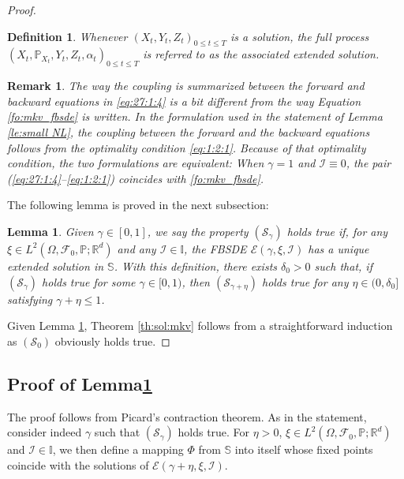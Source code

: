 \documentclass[11pt]{amsart}
\newtheorem{lemma}[theorem]{Lemma}
\newtheorem{definition}[theorem]{Definition}
\newtheorem{remark}[theorem]{Remark}
\begin{document}
\begin{proof}
\begin{definition}
Whenever $(X_{t},Y_{t},Z_{t})_{0 \leq t \leq T}$ is a solution, the full process $(X_{t},{\mathbb P}_{X_{t}},Y_{t},Z_{t},\alpha_{t})_{0 \leq t \leq T}$ is referred to as the  \emph{associated extended solution}.
\end{definition}

\begin{remark}
\label{rem:notation}
The way the coupling is summarized between the forward and backward equations in \eqref{eq:27:1:4} is a bit different from the way Equation \eqref{fo:mkv_fbsde} is written. In the formulation used in the statement of Lemma \ref{le:small NL}, the coupling between the forward and the backward equations follows from the optimality condition \eqref{eq:1:2:1}. Because of that optimality condition, 
the two formulations are equivalent: When $\gamma=1$ and ${\mathcal I}\equiv0$, the pair \emph{(\ref{eq:27:1:4}--\ref{eq:1:2:1})} coincides with \eqref{fo:mkv_fbsde}. 
\end{remark}

The following lemma is proved in the next subsection:

\begin{lemma}
\label{le:fixed point}
Given $\gamma \in  [0,1]$, we say the property $({\mathcal S}_{\gamma})$ holds true if, 
 for any $\xi \in L^2(\Omega,{\mathcal F}_{0},{\mathbb P};{\mathbb R}^d)$ and any ${\mathcal I} \in {\mathbb I}$, 
the FBSDE ${\mathcal E}(\gamma,\xi,{\mathcal I})$ 
has a unique extended solution in ${\mathbb S}$. With this definition, 
 there exists $\delta_{0}>0$ such that, if $({\mathcal S}_{\gamma})$ holds true for some $\gamma \in [0,1)$, then $({\mathcal S}_{\gamma+\eta})$ holds true for any 
 $\eta \in (0,\delta_{0}]$ satisfying $\gamma + \eta \leq 1$. 
\end{lemma}

Given Lemma \ref{le:fixed point}, Theorem \ref{th:sol:mkv} follows from a straightforward induction as $({\mathcal S}_{0})$ obviously holds true. 
\end{proof}

\subsection{Proof of Lemma\ref{le:fixed point}}
The proof follows from Picard's contraction theorem. As in the statement, consider indeed $\gamma$ such that $({\mathcal S}_{\gamma})$ holds true. For $\eta >0$, $\xi \in L^2(\Omega,{\mathcal F}_{0},{\mathbb P};{\mathbb R}^d)$ and ${\mathcal I} \in {\mathbb I}$, we then define a mapping $\Phi$ from ${\mathbb S}$ into itself whose fixed points coincide with 
the solutions of ${\mathcal E}(\gamma+\eta,\xi,{\mathcal I})$. 
\end{document}
